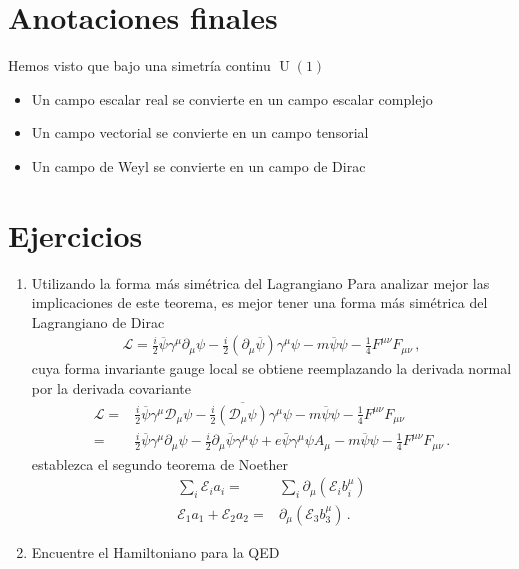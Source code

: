 \section{Anotaciones finales}


Hemos visto que bajo una simetría continu $\operatorname{U}(1)$
\begin{itemize}
 \item Un campo escalar real se convierte en un campo escalar complejo
\item Un campo vectorial se convierte en un campo tensorial
\item Un campo de Weyl se convierte en un campo de Dirac
\end{itemize}




\section{Ejercicios}
\begin{enumerate}
\item Utilizando la forma más simétrica del Lagrangiano
Para analizar mejor las implicaciones de este teorema, es mejor tener una forma más simétrica del Lagrangiano de Dirac
\begin{align}
\mathcal{L}=\frac{i}{2}\overline{\psi} \gamma^\mu{\partial_{\mu}} \psi-\frac{i}{2}\left(\partial_{\mu} \overline{\psi}\right) \gamma^{\mu} \psi-m \overline{\psi} \psi-\frac{1}{4} F^{\mu \nu} F_{\mu \nu}\,,
\end{align}
cuya forma invariante gauge local se obtiene reemplazando la derivada normal por la derivada covariante
\begin{align}
\label{eq:silagqed}
\mathcal{L}=&\frac{i}{2}\overline{\psi} \gamma^\mu{\mathcal{D}_{\mu}} \psi-\frac{i}{2}\overline{\left(\mathcal{D}_{\mu} \psi\right)} \gamma^{\mu} \psi-m \overline{\psi} \psi-\frac{1}{4} F^{\mu \nu} F_{\mu \nu}\nonumber\\
=&\frac{i}{2}\overline{\psi} \gamma^\mu{\partial_{\mu}} \psi-\frac{i}{2}\partial_{\mu} \overline{\psi} \gamma^{\mu} \psi
+e \bar{\psi} \gamma^{\mu} \psi A_{\mu}
-m \overline{\psi} \psi-\frac{1}{4} F^{\mu \nu} F_{\mu \nu}\,.
\end{align}
establezca el segundo teorema de Noether
\begin{align}
  \sum_i \mathcal{E}_ia_i=&\sum_i  \partial_{\mu}   \left(  \mathcal{E}_i b^{\mu}_i  \right)\nonumber\\
  \mathcal{E}_1a_1+\mathcal{E}_2a_2=&
   \partial_{\mu}   \left(  \mathcal{E}_3 b^{\mu}_3  \right)\,.
\end{align}
\item Encuentre el Hamiltoniano para la QED
\end{enumerate}



\renewcommand{\labelenumi}{\theenumi} %

%

